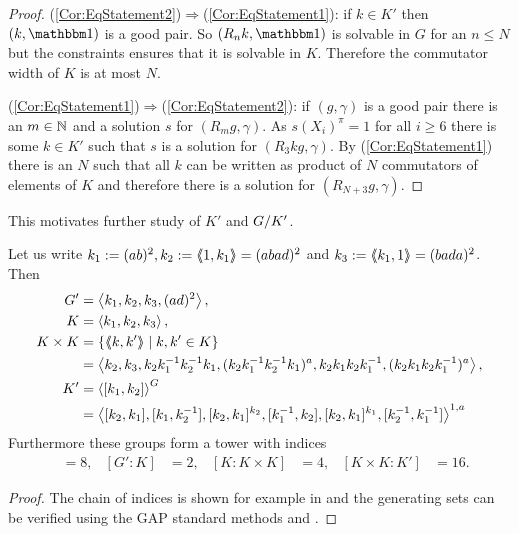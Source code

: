 \documentclass[a4paper,11pt]{amsart}
\begin{document}
\begin{proof}
 (\ref{Cor:EqStatement2})$\Rightarrow$(\ref{Cor:EqStatement1}): if $k\in K'$ then $(k,\id)$ is a good pair.
 So $(R_nk,\id)$ is solvable in $G$ for an $n\leq N$ but the constraints ensures that it is solvable in $K$.
 Therefore the commutator width of $K$ is at most $N$.
 
 (\ref{Cor:EqStatement1})$\Rightarrow$(\ref{Cor:EqStatement2}): if $(g,\gamma)$ is a good pair 
 there is an $m\in \mathbb{N}$ and a solution $s$ for $(R_mg,\gamma)$. As $s(X_i)^\pi =1$ for all $i\geq 6$ there is some $k\in K'$ such that $s$ is 
 a solution for $(R_3kg,\gamma)$. By (\ref{Cor:EqStatement1}) there is 
 an $N$ such that all $k$ can be written as product of $N$ commutators of elements of $K$ and
 therefore there is a solution for $(R_{N+3}g,\gamma)$.
\end{proof}
This motivates further study of $K'$ and ${G/K'}$.
\begin{lem} \label{lem:subgroupsOfG}
Let us write $k_1 := (ab)^2, k_2:=\langle\negthickspace\langle1,k_1\rangle\negthickspace\rangle = (abad)^2$ and $k_3:=\langle\negthickspace\langle k_1,1\rangle\negthickspace\rangle = (bada)^2$. Then 
 \begin{align*}
  G' &= \left< k_1,k_2,k_3,(ad)^2\right>, \\
  K &= \left< k_1,k_2,k_3\right>, \\
  K\times K &= \{\pair{k,k'} \mid k,k'\in K\} \\&= \left< k_2,k_3,k_2k_1^{-1}k_2^{-1}k_1,(k_2k_1^{-1}k_2^{-1}k_1)^a,k_2k_1k_2k_1^{-1},(k_2k_1k_2k_1^{-1})^a  \right>,\\
  K' &= \left< [k_1,k_2] \right>^G \\ 
  &= \left<[k_2,k_1],[k_1,k_2^{-1}],[k_2,k_1]^{k_2},[k_1^{-1},k_2], [k_2,k_1]^{k_1},[k_2^{-1},k_1^{-1}]\right>^{1,a} %
 \end{align*}
Furthermore these groups form a tower with indices
\begin{align*}
  [G:G']&=8, & [G':K]&=2, &[K:K\times K]&= 4, &[K\times K:K']&=16. 
\end{align*}
\end{lem}
\begin{proof}
 The chain of indices is shown for example in \cite{Bartholdi:BranchGroups} and the generating sets can be verified using the GAP standard methods
  and . 
\end{proof}
\end{document}
